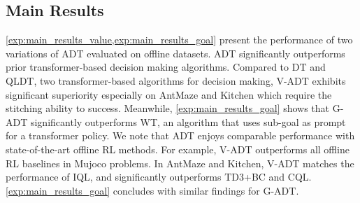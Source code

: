 \subsection{Main Results}

\cref{exp:main_results_value,exp:main_results_goal} present the performance of two variations of ADT evaluated on offline datasets. ADT significantly outperforms prior transformer-based decision making algorithms. 
Compared to DT and QLDT, two transformer-based algorithms for decision making, V-ADT  exhibits significant superiority especially on AntMaze and Kitchen which require the stitching ability to success. 
Meanwhile,   \cref{exp:main_results_goal} shows that G-ADT significantly outperforms WT, an algorithm that uses sub-goal as prompt for a transformer policy.  
We note that ADT enjoys comparable performance with state-of-the-art offline RL methods. 
For example, V-ADT outperforms all offline RL baselines in Mujoco problems. 
In AntMaze and Kitchen, V-ADT matches the performance of IQL, and significantly outperforms TD3+BC and CQL. 
\cref{exp:main_results_goal} concludes with similar findings for G-ADT.  

\iffalse
Finally, we observe a performance gap between ADT and IQL. To better understand this, we learn a transformer policy by {distilling} the IQL algorithm \citep{lee2023supervised,laskin2022context}. 
In particular, given an offline dataset $\cD$, we run IQL on $\cD$ and learn a policy $\pi^\dagger$. 
For each $s\in\cD$ we label it with the action produced by $\pi^\dagger$. This creates a new training dataset which are then used to learn an auto-regressive transformer policy. 
The distilling baseline excludes the effects of the transformer architecture so that the comparison explicitly focuses on the inherit merit of the algorithms. 
Figure \ref{fig:oracle_ablation}

\begin{figure}[!htbp]
\centering
\texttt{[image: exp\_figs/vdt\_oracle\_results.pdf]}
\vspace{-0.6cm} 
\caption{Learning curves of V-ADT and V-ADT Oracle. The performance gap between V-ADT and V-ADT Oracle is limited on some datasets while evident on others, requiring further refinement.}
\label{fig:oracle_ablation}
\end{figure}%

\fi

